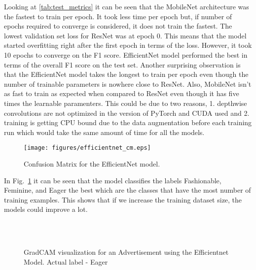 \documentclass[conference]{IEEEtran}
\begin{document}
Looking at \ref{tab:test_metrics} it can be seen that the MobileNet architecture was 
the fastest to train per epoch. It took less time per epoch but, if number of 
epochs required to converge is considered, it does not train the fastest.
The lowest validation set loss for ResNet was at epoch 0. This means that the model 
started overfitting right after the first epoch in terms of the loss. However, it took 
10 epochs to converge on the F1 score.  
EfficientNet model performed the best in terms of the overall F1 score on the test set.
Another surprising observation is that the EfficientNet model takes the longest to 
train per epoch even though the number of trainable parameters is nowhere close to ResNet. 
Also, MobileNet isn't as fast to train as expected when compared to ResNet even though 
it has five times the learnable 
paramenters. This could be due to two reasons, 1. depthwise convolutions are not 
optimized in the version of PyTorch and CUDA used and 2. training is getting CPU bound 
due to the data augmentation before each training run which 
would take the same amount of time for all the models. 


\begin{figure}[htbp]
    \centering
    \texttt{[image: figures/efficientnet\_cm.eps]}  
     \caption{Confusion Matrix for the EfficientNet model.}
     \label{fig:conf}
  \end{figure}

In Fig.~\ref{fig:conf} it can be seen that the model classifies the labels 
Fashionable, Feminine, and Eager the best which are the classes that have 
the most number of training examples. This shows that if we increase the 
training dataset size, the models could improve a lot.


\begin{figure}
    
    \\
    \\
    \caption{GradCAM visualization for an Advertisement using the Efficientnet Model. Actual label - Eager}
    \label{fig:gradcam_1}
  \end{figure}
\end{document}
